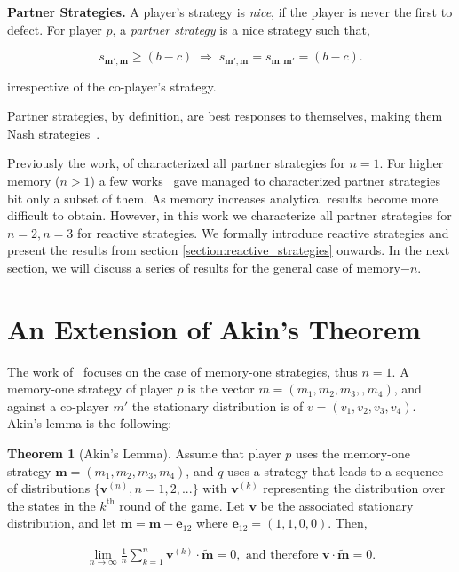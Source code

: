 \documentclass{article}
\theoremstyle{definition}
\newtheorem{theorem}{Theorem}[section]
\begin{document}
{\bf Partner Strategies.} A player's strategy is \textit{nice}, if the player is
never the first to defect. For player $p$, a \textit{partner strategy} is a nice
strategy such that,

\begin{equation}\label{Eq:Partner}
    s_{\mathbf{m'},\mathbf{m}} \geq (b - c) \; \Rightarrow \; s_{\mathbf{m'},\mathbf{m}} = s_{\mathbf{m},\mathbf{m'}} = (b - c).
\end{equation}

irrespective of the co-player's strategy.

Partner strategies, by definition, are best responses to themselves, making them
Nash strategies~\cite{Hilbe:GEB:2015}.


Previously the work, of \citep{akin:EGADS:2016} characterized all partner
strategies for $n=1$. For higher memory ($n>1$) a few
works~\citep{hilbe:PNAS:2017} gave managed to characterized partner strategies
bit only a subset of them. As memory increases analytical results become more
difficult to obtain. However, in this work we characterize all partner
strategies for $n=2, n=3$ for reactive strategies. We formally introduce
reactive strategies and present the results from section
\ref{section:reactive_strategies} onwards. In the next section, we will discuss
a series of results for the general case of memory$-n$.

\section{An Extension of Akin's Theorem}

The work of~\citep{akin:EGADS:2016} focuses on the case of memory-one strategies,
thus $n=1$. A memory-one strategy of player $p$ is the vector $m = (m_1, m_2,
m_3, ,m_4)$, and against a co-player $m'$ the stationary distribution is of $v =
(v_1, v_2, v_3, v_4)$. Akin's lemma is the following:

\begin{theorem}[Akin's Lemma]\label{theorem:akin} Assume that player \(p\) uses
    the memory-one strategy \(\mathbf{m}=(m_1, m_2, m_3, m_4)\), and \(q\) uses
    a strategy that leads to a sequence of distributions \(\{\mathbf{v}^{(n)}, n
    = 1, 2, ...\}\) with \(\mathbf{v}^{(k)}\) representing the distribution over
    the states in the \(k^{\text{th}}\) round of the game. Let  \(\mathbf{v}\)
    be the associated stationary distribution, and let \(\mathbf{\tilde{m}} =
    \mathbf{m} - \mathbf{e}_{12}\) where \(\mathbf{e}_{12} = (1, 1, 0, 0)\).
    Then,
  
    \begin{align}
      \lim_{n \rightarrow \infty} \frac{1}{n} \sum_{k=1}^{n} \mathbf{v}^{(k)} \cdot \mathbf{\tilde{m}} = 0, \text{ and therefore } \mathbf{v} \cdot \mathbf{\tilde{m}} = 0.
    \end{align}
\end{theorem}
\end{document}
